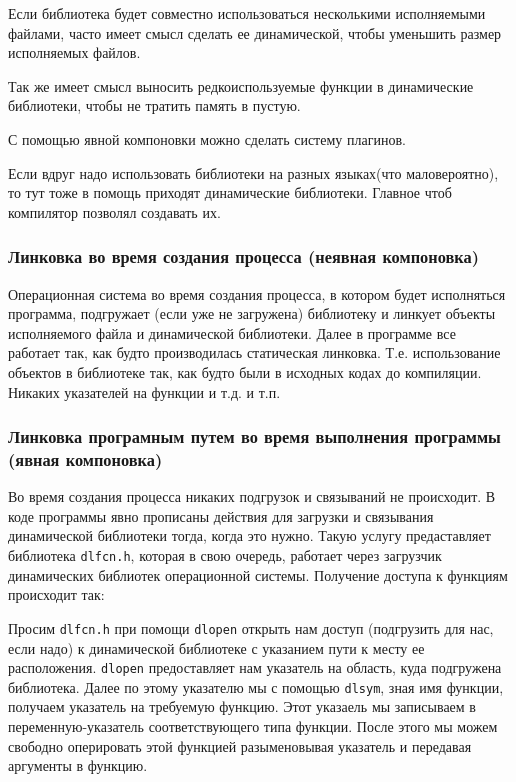 \documentclass[12pt]{article}
\begin{document}
Если библиотека будет совместно использоваться несколькими исполняемыми файлами, часто имеет смысл сделать ее динамической, чтобы уменьшить размер исполняемых файлов.

Так же имеет смысл выносить редкоиспользуемые функции в динамические библиотеки, чтобы не тратить память в пустую.

С помощью явной компоновки можно сделать систему плагинов.

Если вдруг надо использовать библиотеки на разных языках(что маловероятно), то тут тоже в помощь приходят динамические библиотеки. Главное чтоб компилятор позволял создавать их.

\subsubsection*{Линковка во время создания процесса
(неявная компоновка)}
    Операционная система во время создания процесса, в котором будет исполняться программа, подгружает (если уже не загружена) библиотеку и линкует объекты исполняемого файла и динамической библиотеки. Далее в программе все работает так, как будто производилась статическая линковка. Т.е. использование объектов в библиотеке так, как будто были в исходных кодах до компиляции. Никаких указателей на функции и т.д. и т.п.
    
\subsubsection*{Линковка програмным путем во время выполнения программы (явная компоновка)}
    Во время создания процесса никаких подгрузок и связываний не происходит. В коде программы явно прописаны действия для загрузки и связывания динамической библиотеки тогда, когда это нужно. Такую услугу предаставляет библиотека \verb|dlfcn.h|, которая в свою очередь, работает через загрузчик динамических библиотек операционной системы.
    Получение доступа к функциям происходит так:
    
    Просим \verb|dlfcn.h| при помощи \verb|dlopen| открыть нам доступ (подгрузить для нас, если надо) к динамической библиотеке с указанием пути к месту ее расположения. \verb|dlopen| предоставляет нам указатель на область, куда подгружена библиотека. Далее по этому указателю мы с помощью \verb|dlsym|, зная имя функции, получаем указатель на требуемую функцию.
    Этот указаель мы записываем в переменную-указатель соответствующего типа функции. После этого мы можем свободно оперировать этой функцией разыменовывая указатель и передавая аргументы в функцию.
    
\end{document}
